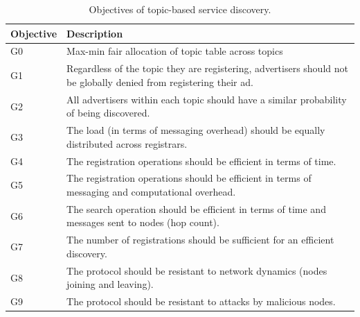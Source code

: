 \begin{table} 
\caption{Objectives of topic-based service discovery.}
\label{tab:objectives}
\renewcommand{\arraystretch}{1.5}
\renewcommand{\tabcolsep}{0.5em}
\centering
\scriptsize{
\begin{tabular} {p{1cm}p{5cm}}
\toprule
\textbf{Objective} & \textbf{Description} \\
\hline
G0 & Max-min fair allocation of topic table across topics \\
\hline
G1 & Regardless of the topic they are registering, advertisers should not be globally denied from registering their ad. \\
\hline
G2 & All advertisers within each topic should have a similar probability of being discovered. \\
\hline
G3 & The load (in terms of messaging overhead) should be equally distributed across registrars. \\
\hline
G4 & The registration operations should be efficient in terms of time. \\
\hline
G5 & The registration operations should be efficient in terms of messaging and computational overhead. \\
\hline 
G6 & The search operation should be efficient in terms of time and messages sent to nodes (hop count). \\
\hline
G7 & The number of registrations should be sufficient for an efficient discovery. \\
\hline
G8 & The protocol should be resistant to network dynamics (nodes joining and leaving). \\
\hline 
G9 & The protocol should be resistant to attacks by malicious nodes. \\
\hline
\end{tabular}
}
\vspace{-0.2in}
\end{table}


\iffalse
